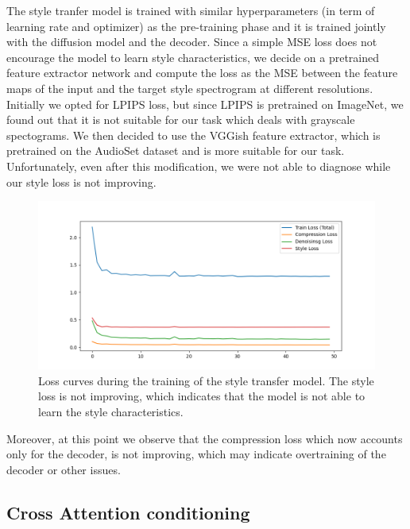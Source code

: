 The style tranfer model is trained with similar hyperparameters (in term of learning rate and optimizer) as the pre-training phase and it is trained jointly with the diffusion model and the decoder. Since a simple MSE loss does not encourage the model to learn style characteristics, we decide on a pretrained feature extractor network and compute the loss as the MSE between the feature maps of the input and the target style spectrogram at different resolutions. Initially we opted for LPIPS loss, but since LPIPS is pretrained on ImageNet, we found out that it is not suitable for our task which deals with grayscale spectograms. We then decided to use the VGGish feature extractor, which is pretrained on the AudioSet dataset and is more suitable for our task. Unfortunately, even after this modification, we were not able to diagnose while our style loss is not improving.

\begin{figure}[h]
    \centering
    \includegraphics[width=\textwidth]{figures/ldm_loss.png}
    \caption{Loss curves during the training of the style transfer model. The style loss is not improving, which indicates that the model is not able to learn the style characteristics.}
    \label{fig:style_transfer}
\end{figure}

\noindent Moreover, at this point we observe that the compression loss which now accounts only for the decoder, is not improving, which may indicate overtraining of the decoder or other issues.

\subsection{Cross Attention conditioning}

